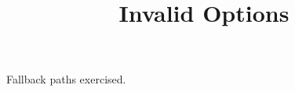 \documentclass[code=unknownbackend,theme=notatheme,titlepage=invalid,lang=klingon]{SUSTechHomework}
\title{Invalid Options}
\begin{document}
\maketitle
Fallback paths exercised.
\end{document}
